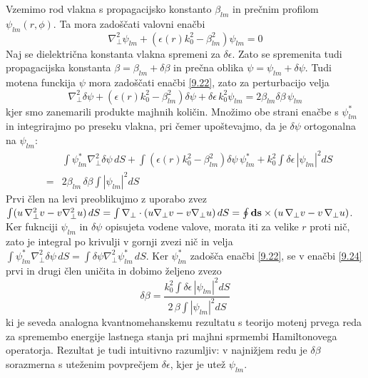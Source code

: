 \documentclass[11pt,fleqn]{book} %
\begin{document}
Vzemimo rod vlakna s propagacijsko konstanto $\beta_{lm}$ in prečnim
profilom $\psi_{lm}\left(r,\phi\right).$ Ta mora zadoščati valovni
enačbi 
\begin{equation}
\nabla_{\bot}^{2}\psi_{lm}+\left(\epsilon(r)k_{0}^{2}-\beta_{lm}^{2}\right)\psi_{lm}=0\label{9.22}
\end{equation}
 Naj se dielektrična konstanta vlakna spremeni za $\delta\epsilon.$
Zato se spremenita tudi propagacijska konstanta $\beta=\beta_{lm}+\delta\beta$
in prečna oblika $\psi=\psi_{lm}+\delta\psi.$ Tudi motena funckija
$\psi$ mora zadoščati enačbi \ref{9.22}, zato za perturbacijo velja
\begin{equation}
\nabla_{\bot}^{2}\delta\psi+\left(\epsilon(r)k_{0}^{2}-\beta_{lm}^{2}\right)\delta\psi+\delta\epsilon\, k_{0}^{2}\psi_{lm}=2\beta_{lm}\delta\beta\,\psi_{lm}\label{9.23}
\end{equation}
 kjer smo zanemarili produkte majhnih količin. Množimo obe strani
enačbe s $\psi_{lm}^{*}$ in integrirajmo po preseku vlakna, pri čemer
upoštevajmo, da je $\delta\psi$ ortogonalna na $\psi_{lm}$: 
\begin{eqnarray}
 &  & \int\psi_{lm}^{*}\nabla_{\bot}^{2}\delta\psi\, dS+\int\left(\epsilon(r)k_{0}^{2}-\beta_{lm}^{2}\right)\delta\psi\,\psi_{lm}^{*}+k_{0}^{2}\int\delta\epsilon\,\left|\psi_{lm}\right|^{2}dS\label{9.24}\\
 & = & 2\beta_{lm}\,\delta\beta\int\left|\psi_{lm}\right|^{2}dS
\end{eqnarray}
 Prvi člen na levi preoblikujmo z uporabo zvez $\int(u\,\nabla_{\bot}^{2}v-v\nabla_{\bot}^{2}u)\, dS=\int\nabla_{\bot}\cdot(u\nabla_{\bot}v-v\nabla_{\bot}u)\, dS=\oint{\bf ds\times(}u\,\nabla_{\bot}v-v\,\nabla_{\bot}u)$.
Ker fuknciji $\psi_{lm}$ in $\delta\psi$ opisujeta vodene valove,
morata iti za velike $r$ proti nič, zato je integral po krivulji
v gornji zvezi nič in velja $\int\psi_{lm}^{*}\nabla_{\bot}^{2}\delta\psi\, dS=\int\delta\psi\nabla_{\bot}^{2}\psi_{lm}^{*}\, dS$.
Ker $\psi_{lm}^{*}$ zadošča enačbi \ref{9.22}, se v enačbi \ref{9.24}
prvi in drugi člen uničita in dobimo željeno zvezo 
\begin{equation}
\delta\beta=\frac{k_{0}^{2}\int\delta\epsilon\,\left|\psi_{lm}\right|^{2}dS}{2\,\beta\int\left|\psi_{lm}\right|^{2}dS}\label{9.25}
\end{equation}
 ki je seveda analogna kvantnomehanskemu rezultatu s teorijo motenj
prvega reda za spremembo energije lastnega stanja pri majhni sprmembi
Hamiltonovega operatorja. Rezultat je tudi intuitivno razumljiv: v
najnižjem redu je $\delta\beta$ sorazmerna s uteženim povprečjem
$\delta\epsilon$, kjer je utež $\psi_{lm}$.
\end{document}
